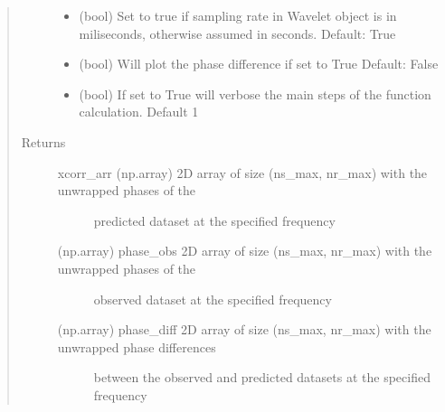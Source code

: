 \documentclass[letterpaper,10pt,english]{sphinxmanual}
\begin{document}
\begin{fulllineitems}
\begin{quote}
\begin{description}
\begin{itemize}
\item {} 
 \textendash{} (bool)     Set to true if sampling rate in Wavelet object is in miliseconds, otherwise assumed
in seconds.
Default: True

\item {} 
 \textendash{} (bool)     Will plot the phase difference if set to True
Default: False

\item {} 
 \textendash{} (bool)     If set to True will verbose the main steps of the function calculation. Default 1

\end{itemize}

\item[{Returns}] \leavevmode
\begin{description}
\item[{xcorr\_arr   (np.array) 2D array of size (ns\_max, nr\_max) with the unwrapped phases of the}] \leavevmode
predicted dataset at the specified frequency

\item[{(np.array)  phase\_obs  2D array of size (ns\_max, nr\_max) with the unwrapped phases of the}] \leavevmode
observed dataset at the specified frequency

\item[{(np.array)  phase\_diff  2D array of size (ns\_max, nr\_max) with the unwrapped phase differences}] \leavevmode
between the observed and predicted datasets at the specified frequency

\end{description}


\end{description}\end{quote}

\end{fulllineitems}

\label{\detokenize{index:module-fullwaveqc.inversion}}
\end{document}

